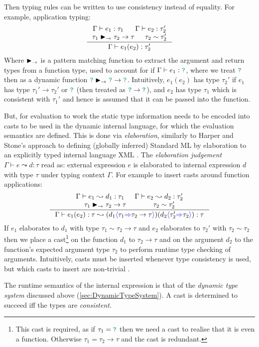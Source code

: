 Then typing rules can be written to use consistency instead of equality. For example, application typing:
\[\inference{\Gamma \vdash e_1 : \tau_1 & \Gamma \vdash e_2 : \tau_2'\\ \tau_1 \funmatch \tau_2 \to \tau & \tau_2 \sim \tau_2'}{\Gamma \vdash e_1(e_2) : \tau_2'}\]
Where $\blacktriangleright_\rightarrow$ is a pattern matching function to extract the argument and return types from a function type, used to account for if $\Gamma \vdash e_1 : {\color{teal}\texttt{?}}$, where we treat ${\color{teal}\texttt{?}}$ then as a dynamic function ${\color{teal}\texttt{?}} \blacktriangleright_\rightarrow {\color{teal}\texttt{?}} \to {\color{teal}\texttt{?}}$.
Intuitively, $e_1(e_2)$ has type $\tau_2'$ if $e_1$ has type $\tau_1' \to \tau_2'$ or ${\color{teal}\texttt{?}}$ (then treated as ${\color{teal}\texttt{?}} \to {\color{teal}\texttt{?}}$), and $e_2$ has type $\tau_1$ which is consistent with $\tau_1'$ and hence is assumed that it can be passed into the function.

But, for evaluation to work the static type information needs to be encoded into casts to be used in the dynamic internal language, for which the evaluation semantics are defined. This is done via \textit{elaboration}, similarly to Harper and Stone's approach to defining (globally inferred) Standard ML \cite{StandardMLTypeTheory} by elaboration to an explicitly typed internal language XML \cite{CoreXML}. The \textit{elaboration judgement} $\Gamma \vdash e \leadsto d : \tau$ read as: external expression $e$ is elaborated to internal expression $d$ with type $\tau$ under typing context $\Gamma$. For example to insert casts around function applications:
\[\inference{\Gamma \vdash e_1 \leadsto d_1 : \tau_1 & \Gamma \vdash e_2 \leadsto d_2 : \tau_2' \\ \tau_1 \funmatch \tau_2 \to \tau  & \tau_2 \sim \tau_2'}{\Gamma \vdash e_1(e_2) : \tau \leadsto (d_1\scast{\tau_1}{\tau_2 \to \tau})(d_2\scast{\tau_2'}{\tau_2}) : \tau}\]
If $e_1$ elaborates to $d_1$ with type $\tau_1 \sim \tau_2 \to \tau$ and $e_2$ elaborates to $\tau_2'$ with $\tau_2 \sim \tau_2$ then we place a cast\footnote{This cast is required, as if $\tau_1 = {\color{teal}\texttt{?}}$ then we need a cast to realise that it is even a function. Otherwise $\tau_1 = \tau_2 \to \tau$ and the cast is redundant.} on the function $d_1$ to $\tau_2 \to \tau$ and on the argument $d_2$ to the function's expected argument type $\tau_2$ to perform runtime type checking of arguments.
Intuitively, casts must be inserted whenever type consistency is used, but which casts to insert are non-trivial \cite{Gradualizer}.

The runtime semantics of the internal expression is that of the \textit{dynamic type system} discussed above (\ref{sec:DynamicTypeSystem}). A cast is determined to succeed iff the types are \textit{consistent}.

